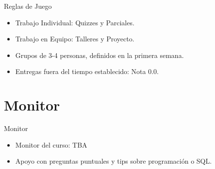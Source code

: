 \documentclass{beamer}
\begin{document}
\begin{frame}{Reglas de Juego}
\begin{itemize}
    \item Trabajo Individual: Quizzes y Parciales.
    \item Trabajo en Equipo: Talleres y Proyecto.
    \item Grupos de 3-4 personas, definidos en la primera semana.
    \item Entregas fuera del tiempo establecido: Nota 0.0.
\end{itemize}
\end{frame}

\section{Monitor}

\begin{frame}{Monitor}
    \begin{itemize}
        \item Monitor del curso: TBA
        \item Apoyo con preguntas puntuales y tips sobre programación o SQL.
    \end{itemize}
\end{frame}
\end{document}
